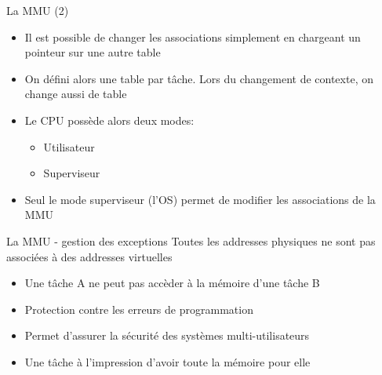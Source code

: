 \begin{frame}{La MMU (2)}
  \begin{itemize}
  \item  Il est  possible de  changer les  associations  simplement en
    chargeant un pointeur sur une autre table
  \item On  défini alors une table  par tâche.  Lors  du changement de
    contexte, on change aussi de table
  \item Le CPU possède alors deux modes:
    \begin{itemize}
    \item  Utilisateur
    \item  Superviseur
    \end{itemize}
  \item  Seul  le  mode  superviseur  (l'OS) permet  de  modifier  les
    associations de la MMU
  \end{itemize}
\end{frame}

\begin{frame}{La MMU - gestion des exceptions}
  Toutes les addresses physiques ne sont pas associées à des addresses
  virtuelles
  \begin{itemize}
  \item Une tâche A ne peut pas accèder à la mémoire d'une tâche B
  \item Protection contre les erreurs de programmation
  \item Permet d'assurer la sécurité des systèmes multi-utilisateurs
  \item Une tâche à l'impression d'avoir toute la mémoire pour elle
  \end{itemize}
\end{frame}


